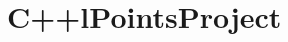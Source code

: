 \chapter{C++l\+Points\+Project}
\hypertarget{md__r_e_a_d_m_e}{}\label{md__r_e_a_d_m_e}
\label{md__r_e_a_d_m_e_autotoc_md0}%
%
